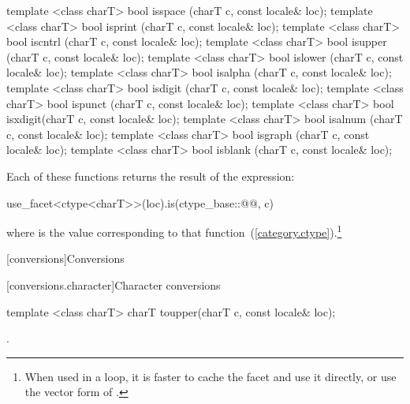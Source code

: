 %
%
%
%
%
%
%
%
%
%
%
%
\begin{itemdecl}
template <class charT> bool isspace (charT c, const locale& loc);
template <class charT> bool isprint (charT c, const locale& loc);
template <class charT> bool iscntrl (charT c, const locale& loc);
template <class charT> bool isupper (charT c, const locale& loc);
template <class charT> bool islower (charT c, const locale& loc);
template <class charT> bool isalpha (charT c, const locale& loc);
template <class charT> bool isdigit (charT c, const locale& loc);
template <class charT> bool ispunct (charT c, const locale& loc);
template <class charT> bool isxdigit(charT c, const locale& loc);
template <class charT> bool isalnum (charT c, const locale& loc);
template <class charT> bool isgraph (charT c, const locale& loc);
template <class charT> bool isblank (charT c, const locale& loc);
\end{itemdecl}

\pnum
Each of these functions
returns the result of the expression:

\begin{codeblock}
use_facet<ctype<charT>>(loc).is(ctype_base::@@, c)
\end{codeblock}

where  is the
value corresponding to that function~(\ref{category.ctype}).\footnote{When
used in a loop, it is faster to cache the
facet and use it directly, or use the vector form of
.}

[conversions]{Conversions}

[conversions.character]{Character conversions}

%
\begin{itemdecl}
template <class charT> charT toupper(charT c, const locale& loc);
\end{itemdecl}

\begin{itemdescr}
\pnum
\returns
{}.
\end{itemdescr}

